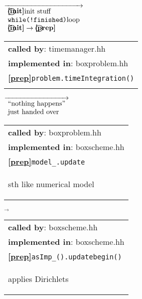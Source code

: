 \begin{landscape}
{\begin{tabular}{|l|}
  \end{tabular} 
{\scriptsize
    $\overrightarrow{ %
      \begin{array}{l} %
	\textbf{\textcircled{\ref{init}}}\textnormal{init stuff}\\
	\textnormal{\texttt{while(!finished)}loop}\\
	\textbf{\textbf{\textcircled{\ref{init}}}} \rightarrow \textbf{\textcircled{\ref{prep}} }
      \end{array}
    }$}
  \begin{tabular}{|l|}
    \hline
    \textbf{called by}: timemanager.hh\\
    \textbf{implemented in}: boxproblem.hh\\  
    \textbf{\textcircled{\ref{prep}}}\verb+problem.timeIntegration()+ \\
    \begin{scriptsize}\end{scriptsize}\\\hline
  \end{tabular}    
\nextline
    {\scriptsize$\overrightarrow{
      \begin{array}{l}
	\textnormal{``nothing happens''} \\
	\textnormal{just handed over}
      \end{array}
    }$}
      \begin{tabular}{|l|}
    \hline
    \textbf{called by}: boxproblem.hh\\
    \textbf{implemented in}: boxscheme.hh\\  
    \textbf{\textcircled{\ref{prep}}}\verb+model_.update+ \\
    \begin{scriptsize}sth like numerical model\end{scriptsize}\\\hline
  \end{tabular}
    $\overrightarrow{}$
    \begin{tabular}{|l|}
      \hline
      \textbf{called by}: boxscheme.hh\\
      \textbf{implemented in}: boxscheme.hh\\  
      \textbf{\textcircled{\ref{prep}}}\verb+asImp_().updatebegin()+ \\
    \begin{scriptsize}applies Dirichlets\end{scriptsize}\\\hline

\end{tabular}}
\end{landscape}
